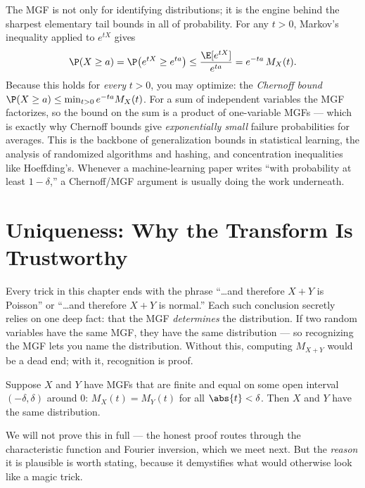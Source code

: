 \begin{applicationbox}
The MGF is not only for identifying distributions; it is the engine behind the
sharpest elementary tail bounds in all of probability. For any $t>0$, Markov's
inequality applied to $e^{tX}$ gives
\[
  \P(X\ge a) = \P\!\left(e^{tX}\ge e^{ta}\right)
             \le \frac{\E[e^{tX}]}{e^{ta}}
             = e^{-ta}\,M_X(t).
\]
Because this holds for \emph{every} $t>0$, you may optimize: the
\emph{Chernoff bound} $\P(X\ge a)\le \min_{t>0} e^{-ta}M_X(t)$. For a sum of
independent variables the MGF factorizes, so the bound on the sum is a product
of one-variable MGFs --- which is exactly why Chernoff bounds give
\emph{exponentially small} failure probabilities for averages. This is the
backbone of generalization bounds in statistical learning, the analysis of
randomized algorithms and hashing, and concentration inequalities like
Hoeffding's. Whenever a machine-learning paper writes ``with probability at least
$1-\delta$,'' a Chernoff/MGF argument is usually doing the work underneath.
\end{applicationbox}

\section{Uniqueness: Why the Transform Is Trustworthy}
\label{ch18:uniqueness}

Every trick in this chapter ends with the phrase ``\dots and therefore $X+Y$ is
Poisson'' or ``\dots and therefore $X+Y$ is normal.'' Each such conclusion
secretly relies on one deep fact: that the MGF \emph{determines} the
distribution. If two random variables have the same MGF, they have the same
distribution --- so recognizing the MGF lets you name the distribution. Without
this, computing $M_{X+Y}$ would be a dead end; with it, recognition is proof.

\begin{theorem}
\label{ch18:thm-uniqueness}
Suppose $X$ and $Y$ have MGFs that are finite and equal on some open interval
$(-\delta,\delta)$ around $0$: $M_X(t)=M_Y(t)$ for all $\abs{t}<\delta$. Then
$X$ and $Y$ have the same distribution.
\end{theorem}

We will not prove this in full --- the honest proof routes through the
characteristic function and Fourier inversion, which we meet next. But the
\emph{reason} it is plausible is worth stating, because it demystifies what
would otherwise look like a magic trick.

